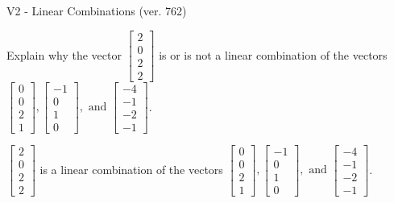 \begin{exercise}
  \begin{exerciseTitle}V2 - Linear Combinations (ver. 762)\end{exerciseTitle}
  \begin{exerciseStatement}
    Explain why the vector \(\left[\begin{array}{c}
2 \\
0 \\
2 \\
2
\end{array}\right]\)  is or is not a linear 
	combination of the vectors \(\left[\begin{array}{c}
0 \\
0 \\
2 \\
1
\end{array}\right] , \left[\begin{array}{c}
-1 \\
0 \\
1 \\
0
\end{array}\right] , \text{ and } \left[\begin{array}{c}
-4 \\
-1 \\
-2 \\
-1
\end{array}\right]\).
	


  \end{exerciseStatement}
  \begin{exerciseAnswer}
   \(\left[\begin{array}{c}
2 \\
0 \\
2 \\
2
\end{array}\right]\) 
  	 is  
	a linear combination of the vectors \(\left[\begin{array}{c}
0 \\
0 \\
2 \\
1
\end{array}\right] , \left[\begin{array}{c}
-1 \\
0 \\
1 \\
0
\end{array}\right] , \text{ and } \left[\begin{array}{c}
-4 \\
-1 \\
-2 \\
-1
\end{array}\right]\).

	
  


  \end{exerciseAnswer}
\end{exercise}